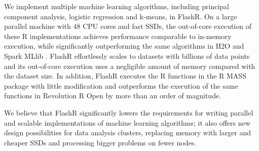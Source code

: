 

We implement multiple machine learning algorithms, including principal component
analysis, logistic regression and k-means, in FlashR. On a large parallel machine
with 48 CPU cores and fast SSDs, the out-of-core execution of these R implementations
achieves performance comparable to in-memory execution, while significantly
outperforming the same algorithms in H2O \cite{h2o} and Spark MLlib
\cite{spark}. FlashR effortlessly scales to datasets with billions
of data points and its out-of-core execution uses a negligible amount of memory
compared with the dataset size. In addition, FlashR executes the R functions
in the R MASS \cite{mass} package with little modification and outperforms
the execution of the same functions in Revolution R Open \cite{rro} by more
than an order of magnitude.

We believe that FlashR significantly lowers the requirements for writing
parallel and scalable implementations of machine learning algorithms; it also
offers new
design possibilities for data analysis clusters, replacing memory with larger
and cheaper SSDs and processing bigger problems on fewer nodes.
